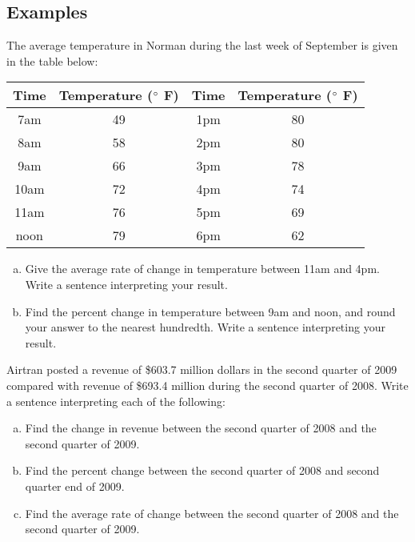\documentclass[notes]{subfiles}
\begin{document}
	\subsection*{Examples}
		\begin{ex}
			The average temperature in Norman during the last week of September is given in the table below:
				\begin{center}
					{\renewcommand{\arraystretch}{1.2}
					\begin{tabular}{|c|c||c|c|} \hline
						\textbf{Time} & \textbf{Temperature} ($^\circ$ F) & \textbf{Time} & \textbf{Temperature} ($^\circ$ F)\\ \hline
						7am & 49 & 1pm & 80\\ \hline
						8am & 58 & 2pm & 80\\ \hline
						9am & 66 & 3pm & 78\\ \hline
						10am & 72 & 4pm & 74\\ \hline
						11am & 76 & 5pm & 69\\ \hline
						noon & 79 & 6pm & 62\\ \hline
					\end{tabular}
					}
					\begin{enumerate}[(a)]
						\item Give the average rate of change in temperature between 11am and 4pm.  Write a sentence interpreting your result.
							
						\item Find the percent change in temperature between 9am and noon, and round your answer to the nearest hundredth.  Write a sentence interpreting your result.
							
					\end{enumerate}	
				\end{center}
		\end{ex}
			\newpage
			
		\begin{ex}
			Airtran posted a revenue of \$603.7 million dollars in the second quarter of 2009 compared with revenue of \$693.4 million during the second quarter of 2008.  Write a sentence interpreting each of the following:
			\begin{enumerate}[(a)]
				\item Find the change in revenue between the second quarter of 2008 and the second quarter of 2009.
					\vs{1}
				\item Find the percent change between the second quarter of 2008 and second quarter end of 2009.
					\vs{1}
				\item Find the average rate of change between the second quarter of 2008 and the second quarter of 2009.
					\vs{1}
			\end{enumerate}
		\end{ex}
			\newpage
\end{document}
